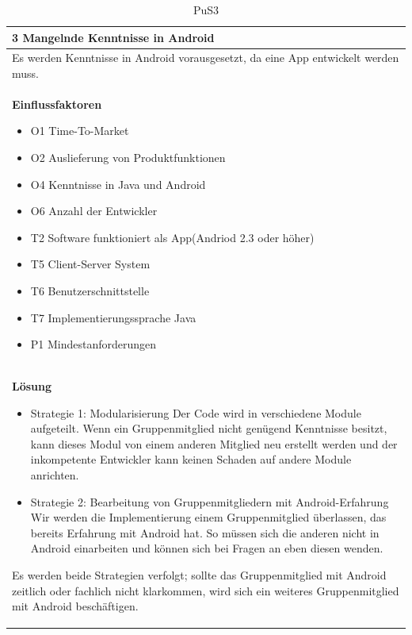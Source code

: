 \documentclass[fontsize=12pt,paper=a4,twoside]{scrartcl}
\begin{document}
\begin{table}[H]
\caption{PuS3}
\begin{tabular}{|p{\textwidth}|}\hline
3 Mangelnde Kenntnisse in Android\\ \hline
Es werden Kenntnisse in Android vorausgesetzt, da eine App entwickelt werden muss. \\ \hline
\textbf{Einflussfaktoren}
\begin{itemize}
\item O1 Time-To-Market
\item O2 Auslieferung von Produktfunktionen
\item O4 Kenntnisse in Java und Android
\item O6 Anzahl der Entwickler
\item T2 Software funktioniert als App(Andriod 2.3 oder höher)
\item T5 Client-Server System
\item T6 Benutzerschnittstelle
\item T7 Implementierungssprache Java
\item P1 Mindestanforderungen
\end{itemize}\\ \hline
\textbf{Lösung}
\begin{itemize}
\item Strategie 1: Modularisierung \leavevmode\newline
Der Code wird in verschiedene Module aufgeteilt. Wenn ein Gruppenmitglied nicht genügend Kenntnisse besitzt, kann dieses Modul von einem anderen Mitglied neu erstellt werden und der inkompetente Entwickler kann keinen Schaden auf andere Module anrichten.
\item Strategie 2: Bearbeitung von Gruppenmitgliedern mit Android-Erfahrung \leavevmode\newline
Wir werden die Implementierung einem Gruppenmitglied überlassen, das bereits Erfahrung mit Android hat. So müssen sich die anderen nicht in Android einarbeiten und können sich bei Fragen an eben diesen wenden.
\end{itemize}
Es werden beide Strategien verfolgt; sollte das Gruppenmitglied mit Android zeitlich oder fachlich nicht klarkommen, wird sich ein weiteres Gruppenmitglied mit Android beschäftigen. \\ \hline
\end{tabular}
\end{table}
\end{document}
